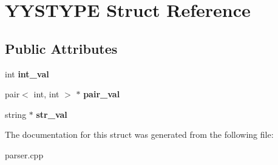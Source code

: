 \hypertarget{structYYSTYPE}{
\section{YYSTYPE Struct Reference}
\label{structYYSTYPE}
}
\subsection*{Public Attributes}
\begin{DoxyCompactItemize}
\item 
\hypertarget{structYYSTYPE_abb5ac8065f8558a930c5c3694997df9e}{
int {\bfseries int\_\-val}}
\label{structYYSTYPE_abb5ac8065f8558a930c5c3694997df9e}

\item 
\hypertarget{structYYSTYPE_ad76c2ac29c0269eb065c6279f8edf11c}{
pair$<$ int, int $>$ $\ast$ {\bfseries pair\_\-val}}
\label{structYYSTYPE_ad76c2ac29c0269eb065c6279f8edf11c}

\item 
\hypertarget{structYYSTYPE_a15b7a0276ceb1411340c288b4278e812}{
string $\ast$ {\bfseries str\_\-val}}
\label{structYYSTYPE_a15b7a0276ceb1411340c288b4278e812}

\end{DoxyCompactItemize}


The documentation for this struct was generated from the following file:\begin{DoxyCompactItemize}
\item 
parser.cpp\end{DoxyCompactItemize}
